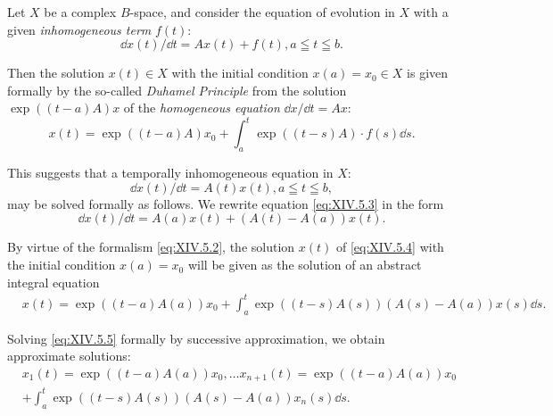 \label{sec:XIV.5}

Let $X$ be a complex $B$-space, and consider the equation of evolution in $X$ with a given \emph{inhomogeneous term} $f(t)$: 
\begin{equation}\label{eq:XIV.5.1}
\dd x (t) / \dd t = A x (t) + f (t), a \leqq t \leqq b.
\end{equation}

Then the solution $x(t) \in X$ with the initial condition $x(a) = x_0 \in X$ is given formally by the so-called \emph{Duhamel Principle} from the solution $\exp((t - a)A)x$ of the \emph{homogeneous equation} $\dd x/\dd t = Ax$: 
\begin{equation}\label{eq:XIV.5.2}
x (t) = \exp ((t - a) A) x _{0} + \int_{a} ^{t} \exp ((t - s) A) \cdot f (s) \dd s.
\end{equation}

This suggests that a temporally inhomogeneous equation in $X$: 
\begin{equation}\label{eq:XIV.5.3}
\dd x (t) / \dd t = A (t) x (t), a \leqq t \leqq b,
\end{equation}
may be solved formally as follows. We rewrite equation \eqref{eq:XIV.5.3} in the form 
\begin{equation}\label{eq:XIV.5.4}
\dd x (t) / \dd t = A (a) x (t) + (A (t) - A (a)) x (t).
\end{equation}

By virtue of the formalism \eqref{eq:XIV.5.2}, the solution $x(t)$ of \eqref{eq:XIV.5.4} with the initial condition $x(a) = x_{0}$ will be given as the solution of an abstract integral equation 
\begin{equation}\label{eq:XIV.5.5}
\begin{aligned}
&x (t) = \exp ((t - a) A (a)) x _{0} + \int_{a} ^{t} \exp ((t - s) A (s)) (A (s) - A (a)) x (s) \dd s.
\end{aligned}
\end{equation}

Solving \eqref{eq:XIV.5.5} formally by successive approximation, we obtain approximate solutions: 
\[
\begin{aligned}
&x _{1} (t) = \exp ((t - a) A (a)) x _{0}, \dots x _{n+1} (t) = \exp ((t - a) A (a)) x _{0}
\\
&+ \int_{a} ^{t} \exp ((t - s) A (s)) (A (s) - A (a)) x _{n} (s) \dd s.
\end{aligned}
\]

